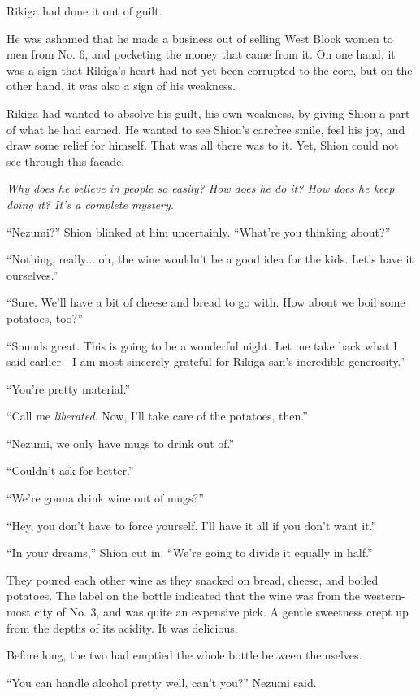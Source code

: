 Rikiga had done it out of guilt.

He was ashamed that he made a business out of selling West Block women
to men from No. 6, and pocketing the money that came from it. On one
hand, it was a sign that Rikiga's heart had not yet been corrupted to
the core, but on the other hand, it was also a sign of his weakness.

Rikiga had wanted to absolve his guilt, his own weakness, by giving
Shion a part of what he had earned. He wanted to see Shion's carefree
smile, feel his joy, and draw some relief for himself. That was all
there was to it. Yet, Shion could not see through this facade.

\emph{Why does he believe in people so easily? How does he do it?
How does he keep doing it? It's a complete mystery.}

``Nezumi?'' Shion blinked at him uncertainly. ``What're you thinking
about?''

``Nothing, really... oh, the wine wouldn't be a good idea for the kids.
Let's have it ourselves.''

``Sure. We'll have a bit of cheese and bread to go with. How about we
boil some potatoes, too?''

``Sounds great. This is going to be a wonderful night. Let me take back
what I said earlier---I am most sincerely grateful for Rikiga-san's
incredible generosity.''

``You're pretty material.''

``Call me \emph{liberated}. Now, I'll take care of the potatoes, then.''

``Nezumi, we only have mugs to drink out of.''

``Couldn't ask for better.''

``We're gonna drink wine out of mugs?''

``Hey, you don't have to force yourself. I'll have it all if you don't
want it.''

``In your dreams,'' Shion cut in. ``We're going to divide it equally in
half.''

They poured each other wine as they snacked on bread, cheese, and boiled
potatoes. The label on the bottle indicated that the wine was from the
western-most city of No. 3, and was quite an expensive pick. A gentle
sweetness crept up from the depths of its acidity. It was delicious.

Before long, the two had emptied the whole bottle between themselves.

``You can handle alcohol pretty well, can't you?'' Nezumi said.

